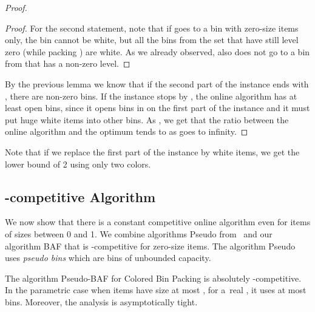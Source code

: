 \documentclass[11pt,a4paper]{article}
\begin{document}
\begin{proof}
\begin{proof}
For the second statement, note that if  goes to a bin with zero-size items only, the bin cannot be white,
but all the bins from the set  that have still level zero (while packing ) are white.
As we already observed,  also does not go to a bin from  that has a non-zero level.
\end{proof}

By the previous lemma we know that if the second part of the instance ends with ,
there are  non-zero bins. If the instance stops by ,
the online algorithm has at least  open bins,
since it opens bins in  on the first part of the instance and it must put  huge white items into other bins.
As , we get that the ratio between the online algorithm
and the optimum tends to  as  goes to infinity.
\end{proof}

Note that if we replace the first part of the instance by  white items, we get the lower bound of 2 using only two colors.

\subsection{-competitive Algorithm}\label{sec:anySizeUB}

We now show that there is a constant competitive online algorithm even for items of sizes between 0 and 1.
We combine algorithms Pseudo from~\cite{balogh14} and our algorithm BAF that is -competitive for zero-size items.
The algorithm Pseudo uses \textit{pseudo bins} which are bins of unbounded capacity.

\begin{center}
\end{center}

\begin{theorem}
\label{thm:PseudoBAF}
The algorithm Pseudo-BAF for Colored Bin Packing is absolutely
-com\-pe\-ti\-ti\-ve. In the parametric case when items have size
at most , for a~real , it uses at most  bins. Moreover, the analysis is
asymptotically tight.
\end{theorem}
\end{document}

